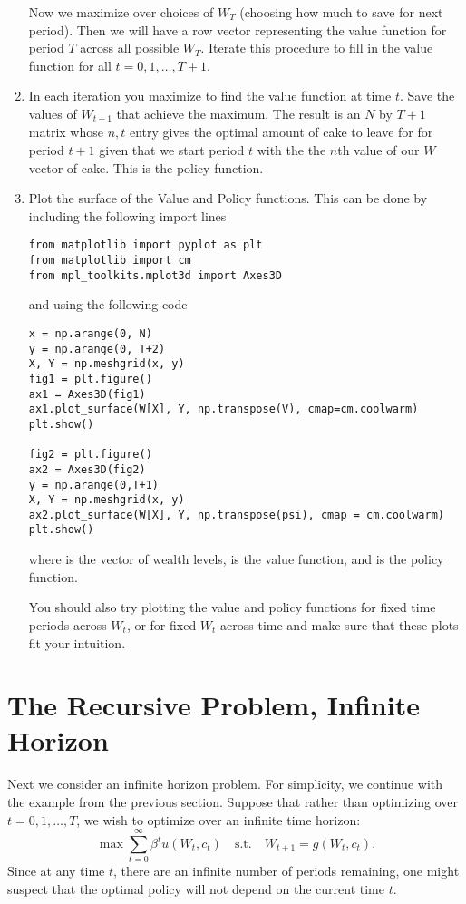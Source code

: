 \begin{problem}
\begin{enumerate}
Now we maximize over choices of $W_T$ (choosing how much to save for next period).  Then we will have a row vector representing the value function for period $T$ across all possible $W_T$.  Iterate this procedure to fill in the value function for all $t=0,1,\ldots, T+1$.

\item In each iteration you maximize to find the value function at time $t$.  Save the values of $W_{t+1}$ that achieve the maximum.  The result is an $N$ by $T+1$ matrix whose $n,t$ entry gives the optimal amount of cake to leave for for period $t+1$ given that we start period $t$ with the the $n$th value of our $W$ vector of cake.  This is the policy function.

\item Plot the surface of the Value and Policy functions.  This can be done by including the following import lines
\begin{lstlisting}
from matplotlib import pyplot as plt
from matplotlib import cm
from mpl_toolkits.mplot3d import Axes3D
\end{lstlisting}
and using the following code
\begin{lstlisting}
x = np.arange(0, N)
y = np.arange(0, T+2)
X, Y = np.meshgrid(x, y)
fig1 = plt.figure()
ax1 = Axes3D(fig1)
ax1.plot_surface(W[X], Y, np.transpose(V), cmap=cm.coolwarm)
plt.show()

fig2 = plt.figure()
ax2 = Axes3D(fig2)
y = np.arange(0,T+1)
X, Y = np.meshgrid(x, y)
ax2.plot_surface(W[X], Y, np.transpose(psi), cmap = cm.coolwarm)
plt.show()
\end{lstlisting}
where  is the vector of wealth levels,  is the value function, and  is the policy function.

You should also try plotting the value and policy functions for fixed time periods across $W_t$, or for fixed $W_t$ across time and make sure that these plots fit your intuition.
\end{enumerate}
\end{problem}

\section*{The Recursive Problem, Infinite Horizon}
Next we consider an infinite horizon problem.  For simplicity, we continue with the example from the previous section.  Suppose that rather than optimizing over $t = 0,1,\ldots,T$, we wish to optimize over an infinite time horizon:
\begin{equation*}
\max \sum_{t=0}^\infty \beta^t u(W_t,c_t) \quad \text{s.t.} \quad W_{t+1} = g(W_t,c_t).
\end{equation*}
Since at any time $t$, there are an infinite number of periods remaining, one might suspect that the optimal policy will not depend on the current time $t$.

